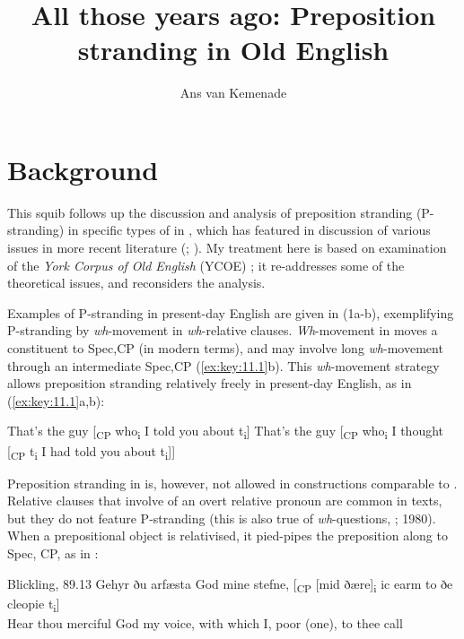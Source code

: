 \documentclass[output=paper]{langsci/langscibook}
\author{Ans van Kemenade\affiliation{Radboud University}}
\title{All those years ago: Preposition stranding in Old English}
\begin{document}
\glsresetall

\section{Background}

This squib follows up the discussion and analysis of preposition stranding
(P-stranding)  in specific types of   in
\citet{vanKemenade1987}, which has featured in discussion of various issues in
more recent literature (\citealt{Alcorn2014}; \citealt{EmoFaa2014}).  My
treatment here is based on examination of the \textit{York Corpus of Old
English} (\gls{YCOE}) \parencite{Tayloretal2003}; it
re-addresses some of the theoretical issues, and reconsiders the analysis.

Examples of P-stranding in present-day English are given in (1a-b),
exemplifying P-stranding by \textit{wh}-movement in \textit{wh}-relative
clauses. \textit{Wh}-movement in  moves a constituent to
Spec,CP (in modern terms), and may involve long \textit{wh}-movement through an
intermediate Spec,CP (\ref{ex:key:11.1}b). This \textit{wh}-movement strategy
allows preposition stranding relatively freely in present-day English, as in
(\ref{ex:key:11.1}a,b):\largerpage

\ea%
    \label{ex:key:11.1}
	\ea That’s the guy [\textsubscript{CP} who\textsubscript{i} I told you about t\textsubscript{i}]
	\ex That’s the guy [\textsubscript{CP} who\textsubscript{i} I thought [\textsubscript{CP} t\textsubscript{i} I had told you about t\textsubscript{i}]]
	\z
\z

Preposition stranding in  is, however, not allowed in constructions
comparable to . Relative clauses that involve  of an
overt relative pronoun are common in  texts, but they do not feature
P-stranding (this is also true of \textit{wh}-questions, \citealt{Allen1977};
1980). When a prepositional object is relativised, it pied-pipes the
preposition along to Spec, CP, as in :

\ea Blickling, 89.13 \parencite[270]{Allen1980}\label{ex:key:11.2}
    \sn
    \gll Gehyr ðu arfæsta God mine stefne, [\textsubscript{CP} [mid ðære]\textsubscript{i}   ic earm {}  to ðe cleopie  t\textsubscript{i}]\\
    Hear thou merciful God my voice, {} with \hphantom{[}which I, poor (one), to thee call\\
\z
\end{document}
